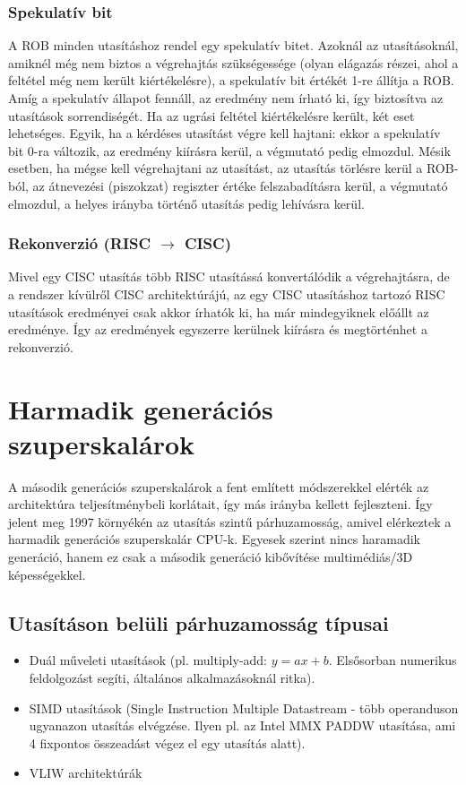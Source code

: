\subsubsection{Spekulatív bit}
A ROB minden utasításhoz rendel egy spekulatív bitet.
Azoknál az utasításoknál, amiknél még nem biztos a végrehajtás szükségessége (olyan elágazás részei, ahol a feltétel még nem került kiértékelésre), a spekulatív bit értékét 1-re állítja a ROB.
Amíg a spekulatív állapot fennáll, az eredmény nem írható ki, így biztosítva az utasítások sorrendiségét.
Ha az ugrási feltétel kiértékelésre került, két eset lehetséges.
Egyik, ha a kérdéses utasítást végre kell hajtani: ekkor a spekulatív bit 0-ra változik, az eredmény kiírásra kerül, a végmutató pedig elmozdul.
Mésik esetben, ha mégse kell végrehajtani az utasítást, az utasítás törlésre kerül a ROB-ból, az átnevezési (piszokzat) regiszter értéke felszabadításra kerül, a végmutató elmozdul, a helyes irányba történő utasítás pedig lehívásra kerül.
\subsubsection{Rekonverzió (RISC $\rightarrow$ CISC)}
Mivel egy CISC utasítás több RISC utasítássá konvertálódik a végrehajtásra, de a rendszer kívülről CISC architektúrájú, az egy CISC utasításhoz tartozó RISC utasítások eredményei csak akkor írhatók ki, ha már mindegyiknek előállt az eredménye.
Így az eredmények egyszerre kerülnek kiírásra és megtörténhet a rekonverzió.

\section{Harmadik generációs szuperskalárok}
A második generációs szuperskalárok a fent említett módszerekkel elérték az architektúra teljesítménybeli korlátait, így más irányba kellett fejleszteni.
Így jelent meg 1997 környékén az utasítás szintű párhuzamosság, amivel elérkeztek a harmadik generációs szuperskalár CPU-k.
Egyesek szerint nincs haramadik generáció, hanem ez csak a második generáció kibővítése multimédiás/3D képességekkel.

\subsection{Utasításon belüli párhuzamosság típusai}
\begin{itemize}
    \item Duál műveleti utasítások (pl. multiply-add: $y=ax+b$. Elsősorban numerikus feldolgozást segíti, általános alkalmazásoknál ritka).
    \item SIMD utasítások (Single Instruction Multiple Datastream - több operanduson ugyanazon utasítás elvégzése. Ilyen pl. az Intel MMX PADDW utasítása, ami 4 fixpontos összeadást végez el egy utasítás alatt).
    \item VLIW architektúrák
\end{itemize}

